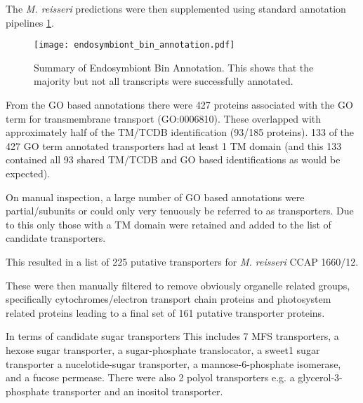
The \textit{M. reisseri} predictions were then supplemented using standard
annotation pipelines \cref{fig:endo_annot}.


\begin{figure}
    \centering
    \texttt{[image: endosymbiont\_bin\_annotation.pdf]}
    \caption[Summary of \textit{M. reisseri} endosymbiont bin annotation]{Summary
    of Endosymbiont Bin Annotation. This shows that the majority but not all transcripts
were successfully annotated.} 
\label{fig:endo_annot}
\end{figure}

From the GO based annotations there were 427 proteins associated
with the GO term for transmembrane transport (GO:0006810).
These overlapped with approximately half of the TM/TCDB identification 
(93/185 proteins).  133 of the 427 GO term annotated transporters
had at least 1 TM domain (and this 133 contained all 93 shared TM/TCDB and GO 
based identifications as would be expected). 

On manual inspection, a large number of GO based annotations were partial/subunits
or could only very tenuously be referred to as transporters. 
Due to this only those with a TM domain were retained and added to the list
of candidate transporters. 

This resulted in a list of 225 putative transporters 
for \textit{M. reisseri} CCAP 1660/12.

These were then manually filtered to remove obviously organelle
related groups, specifically cytochromes/electron transport chain
proteins and photosystem related proteins leading to a final
set of 161 putative transporter proteins.

In terms of candidate sugar transporters 
This includes 7 MFS transporters, a hexose sugar transporter, 
a sugar-phosphate translocator, a sweet1 sugar transporter
a nucelotide-sugar transporter, a mannose-6-phosphate isomerase,
and a fucose permease. 
There were also 2 polyol transporters e.g. a glycerol-3-phosphate transporter
and an inositol transporter.

